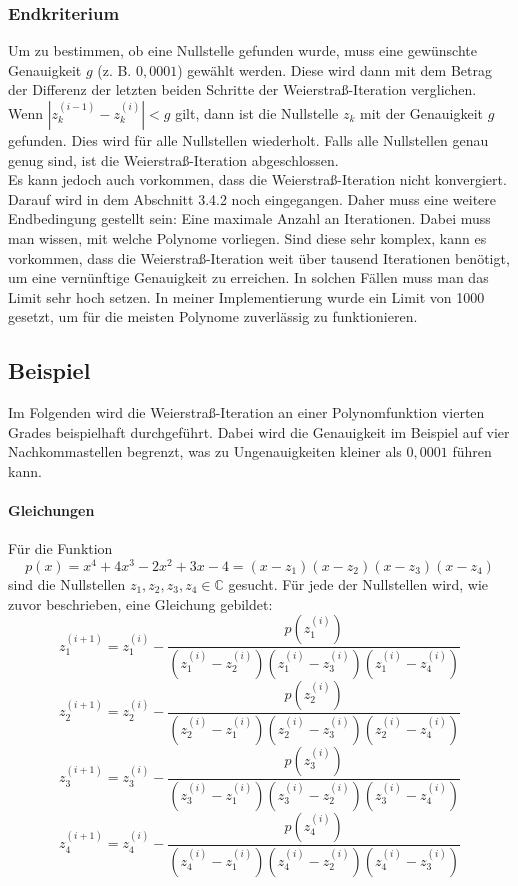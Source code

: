 \documentclass[12pt]{article}
\begin{document}
\subsubsection{Endkriterium}
Um zu bestimmen, ob eine Nullstelle gefunden wurde, muss eine gewünschte Genauigkeit $g$ (z. B. $0,0001$) gewählt werden. Diese wird dann mit dem Betrag der Differenz der letzten beiden Schritte der Weierstraß-Iteration verglichen. Wenn $|z_k^{(i-1)}-z_k^{(i)}| < g$ gilt, dann ist die Nullstelle $z_k$ mit der Genauigkeit $g$ gefunden. Dies wird für alle Nullstellen wiederholt. Falls alle Nullstellen genau genug sind, ist die Weierstraß-Iteration abgeschlossen.\\
Es kann jedoch auch vorkommen, dass die Weierstraß-Iteration nicht konvergiert. Darauf wird in dem Abschnitt 3.4.2 noch eingegangen. Daher muss eine weitere Endbedingung gestellt sein: Eine maximale Anzahl an Iterationen. Dabei muss man wissen, mit welche Polynome vorliegen. Sind diese sehr komplex, kann es vorkommen, dass die Weierstraß-Iteration weit über tausend Iterationen benötigt, um eine vernünftige Genauigkeit zu erreichen. In solchen Fällen muss man das Limit sehr hoch setzen. In meiner Implementierung wurde ein Limit von 1000 gesetzt, um für die meisten Polynome zuverlässig zu funktionieren.

\subsection{Beispiel}
Im Folgenden wird die Weierstraß-Iteration an einer Polynomfunktion vierten Grades beispielhaft durchgeführt. Dabei wird die Genauigkeit im Beispiel auf vier Nachkommastellen begrenzt, was zu Ungenauigkeiten kleiner als $0,0001$ führen kann.
\paragraph{Gleichungen}
Für die Funktion
\begin{equation*}
    p(x) = x^4 + 4x^3 - 2x^2 + 3x - 4 = (x-z_1)(x-z_2)(x-z_3)(x-z_4)
\end{equation*}
sind die Nullstellen $z_1,z_2,z_3,z_4 \in \mathbb{C}$ gesucht. Für jede der Nullstellen wird, wie zuvor beschrieben, eine Gleichung gebildet:
\begin{equation*}
    z_1^{(i+1)} = z_1^{(i)}-\frac{p(z_1^{(i)})}{(z_1^{(i)}-z_2^{(i)})(z_1^{(i)}-z_3^{(i)})(z_1^{(i)}-z_4^{(i)})}
\end{equation*}
\begin{equation*}
    z_2^{(i+1)} = z_2^{(i)}-\frac{p(z_2^{(i)})}{(z_2^{(i)}-z_1^{(i)})(z_2^{(i)}-z_3^{(i)})(z_2^{(i)}-z_4^{(i)})}
\end{equation*}
\begin{equation*}
    z_3^{(i+1)} = z_3^{(i)}-\frac{p(z_3^{(i)})}{(z_3^{(i)}-z_1^{(i)})(z_3^{(i)}-z_2^{(i)})(z_3^{(i)}-z_4^{(i)})}
\end{equation*}
\begin{equation*}
    z_4^{(i+1)} = z_4^{(i)}-\frac{p(z_4^{(i)})}{(z_4^{(i)}-z_1^{(i)})(z_4^{(i)}-z_2^{(i)})(z_4^{(i)}-z_3^{(i)})}
\end{equation*}
\end{document}
